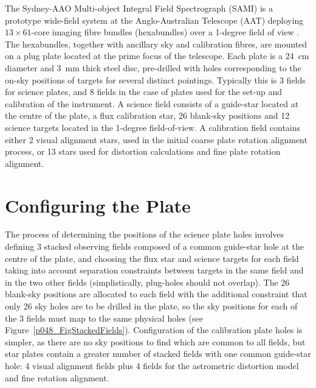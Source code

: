 The Sydney-AAO Multi-object Integral Field Spectrograph (SAMI) is a prototype wide-field system at the Anglo-Australian Telescope (AAT) deploying $13 \times 61$-core imaging fibre bundles (hexabundles) over a 1-degree field of view \citep{2012clb+}. The hexabundles, together with ancillary sky and calibration fibres, are mounted on a plug plate located at the prime focus of the telescope. Each plate is a 24~cm diameter and 3~mm thick steel disc, pre-drilled with holes corresponding to the on-sky positions of targets for several distinct pointings. Typically this is 3 fields for science plates, and 8 fields in the case of plates used for the set-up and calibration of the instrument.
%
A science field consists of a guide-star located at the centre of the plate, a flux calibration star, 26 blank-sky positions and 12 science targets located in the 1-degree field-of-view. A calibration field contains either 2 visual alignment stars, used in the initial coarse plate rotation alignment process, or 13 stars used for distortion calculations and fine plate rotation alignment.

\section{Configuring the Plate}
The process of determining the positions of the science plate holes involves defining 3 stacked observing fields composed of a common guide-star hole at the centre of the plate, and choosing the flux star and science targets for each field taking into account separation constraints between targets in the same field and in the two other fields (simplistically, plug-holes should not overlap). The 26 blank-sky positions are allocated to each field with the additional constraint that only 26 sky holes are to be drilled in the plate, so the sky positions for each of the 3 fields must map to the same physical holes (see Figure~\ref{p048_FigStackedFields}). Configuration of the calibration plate holes is simpler, as there are no sky positions to find which are common to all fields, but star plates contain a greater number of stacked fields with one common guide-star hole: 4 visual alignment fields plus 4 fields for the astrometric distortion model and fine rotation alignment.

